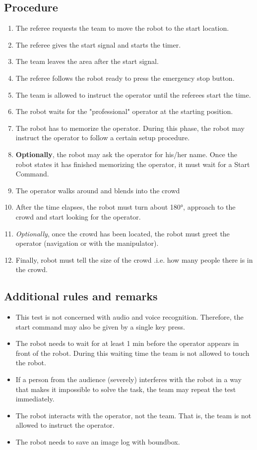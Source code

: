 \subsection*{Procedure}
	\begin{enumerate}[nosep]
		\item The referee requests the team to move the robot to the start location.
		\item The referee gives the start signal and starts the timer.
		\item The team leaves the area after the start signal.		
		\item The referee follows the robot ready to press the emergency stop button.
		
		\item The team is allowed to instruct the operator until the referees start the time.
		\item The robot waits for the "professional" operator at the starting position.
		\item The robot has to memorize the operator. During this phase, the robot may instruct the operator to follow a certain setup procedure.
		\item \textbf{Optionally}, the robot may ask the operator for his/her name.
		Once the robot states it has finished memorizing the operator, it must wait for a Start Command.
		\item The operator walks around and blends into the crowd
		\item After the time elapses, the robot must turn about 180°, approach to the crowd and start looking for the operator.
		\item \textit{Optionally}, once the crowd has been located, the robot must greet the operator (navigation or with the manipulator).
		\item Finally, robot must tell the size of the crowd .i.e. how many people there is in the crowd.
		

	\end{enumerate}

\subsection*{Additional rules and remarks}
\begin{itemize}[nosep]
	\item This test is not concerned with audio and voice recognition. Therefore, the start command may also be given by a single key press.
	\item The robot needs to wait for at least 1 min before the operator appears in front of the robot. During this waiting time the team is not allowed to touch the robot.
	\item If a person from the audience (severely) interferes with the robot in a way that makes it impossible to solve the task, the team may repeat the test immediately.
	\item The robot interacts with the operator, not the team. That is, the team is not allowed to instruct the operator.
    \item The robot needs to save an image log with boundbox.
\end{itemize}


